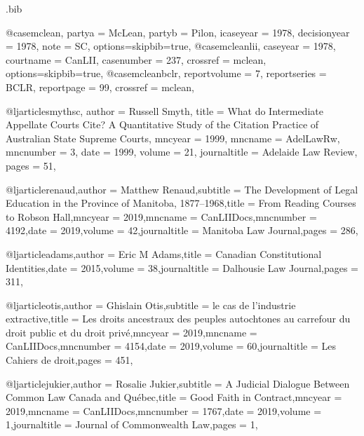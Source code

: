 \begin{filecontents*}[overwrite]{\jobname.bib}


@case{mclean,
  partya = {McLean}, 
  partyb = {Pilon},
  icaseyear = {1978},
  decisionyear = {1978},
  note = {SC},
  options={skipbib=true},
  }
@case{mcleanlii,
  caseyear = {1978},
  courtname = {CanLII},
  casenumber = {237},
  crossref = {mclean},
  options={skipbib=true},
  }
@case{mcleanbclr,
  reportvolume = {7},
  reportseries = {BCLR},
  reportpage = {99},
  crossref = {mclean},
  	}








@ljarticle{smythsc,
author = {Russell Smyth},
title = {What do Intermediate Appellate Courts Cite? A Quantitative Study of the Citation Practice of Australian State Supreme Courts},
mncyear = {1999},
mncname = {AdelLawRw},
mncnumber = {3},
date = {1999},
volume = {21},
journaltitle = {Adelaide Law Review},
pages = {51},
}

@ljarticle{renaud,author = {Matthew Renaud},subtitle = {The Development of Legal Education in the Province of Manitoba, 1877–1968},title = {From Reading Courses to Robson Hall},mncyear = {2019},mncname = {CanLIIDocs},mncnumber = {4192},date = {2019},volume = {42},journaltitle = {Manitoba Law Journal},pages = {286},}

@ljarticle{adams,author = {Eric M Adams},title = {Canadian Constitutional Identities},date = {2015},volume = {38},journaltitle = {Dalhousie Law Journal},pages = {311},}

@ljarticle{otis,author = {Ghislain Otis},subtitle = {le cas de l’industrie extractive},title = {Les droits ancestraux des peuples autochtones au carrefour du droit public et du droit privé},mncyear = {2019},mncname = {CanLIIDocs},mncnumber = {4154},date = {2019},volume = {60},journaltitle = {Les Cahiers de droit},pages = {451},}

@ljarticle{jukier,author = {Rosalie Jukier},subtitle = {A Judicial Dialogue Between Common Law Canada and Québec},title = {Good Faith in Contract},mncyear = {2019},mncname = {CanLIIDocs},mncnumber = {1767},date = {2019},volume = {1},journaltitle = {Journal of Commonwealth Law},pages = {1},}


\end{filecontents*}
